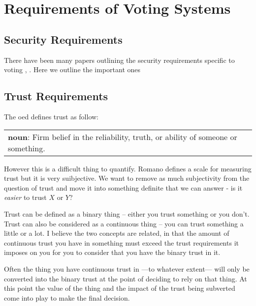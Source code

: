 
\chapter{Requirements of Voting Systems}
\label{ch:req}

\section{Security Requirements}
\label{ch:req:sec}

There have been many papers outlining the security requirements specific to voting \cite{epstein_electronic_2007}, \cite{delaune_formalising_nodate}. Here we outline the important ones


\section{Trust Requirements}
\label{ch:req:trust}

The \gls{oed} defines trust as follow:

\vspace{1em}
\noindent \begin{tabular}{|p{}}
    \noindent \textbf{noun}: Firm belief in the reliability, truth, or ability of someone or something.
\end{tabular}
\vspace{1em}

However this is a difficult thing to quantify. Romano \cite{romano_nature_2003} defines a scale for measuring trust but it is very suibjective. We want to remove as much subjectivity from the question of trust and move it into something definite that we can answer - is it \emph{easier} to trust $X$ or $Y$?

Trust can be defined as a binary thing -- either you trust something or you don't. Trust can also be considered as a continuous thing -- you can trust something a little or a lot. I believe the two concepts are related, in that the amount of continuous trust you have in something must exceed the trust requirements it imposes on you for you to consider that you have the binary trust in it.

Often the thing you have continuous trust in ---to whatever extent--- will only be converted into the binary trust at the point of deciding to rely on that thing. At this point the value of the thing and the impact of the trust being subverted come into play to make the final decision.

